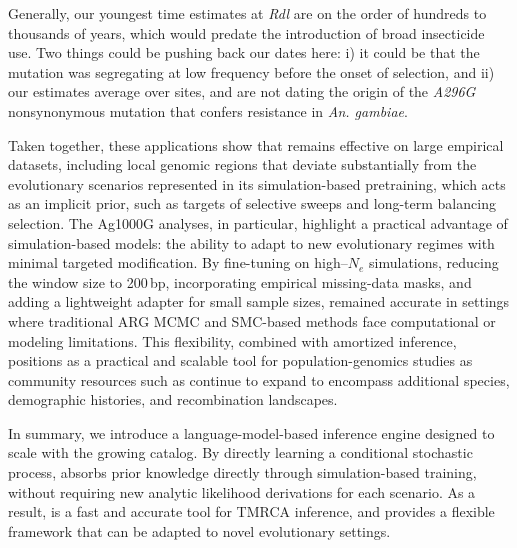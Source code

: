 \documentclass[9pt,twocolumn,twoside]{pnas-new}
\begin{document}
Generally, our youngest time estimates at \emph{Rdl} are on the order of hundreds to thousands of years, 
which would predate the introduction of broad insecticide use. 
Two things could be pushing back our dates here: i) it could
be that the mutation was segregating at low frequency before the onset of
selection, and ii) our estimates average over sites, and are not dating 
the origin of the \emph{A296G} nonsynonymous mutation that confers 
resistance in \emph{An. gambiae}.

Taken together, these applications show that \cxtkit remains effective on large empirical datasets, 
including local genomic regions that deviate substantially from the evolutionary scenarios represented in its simulation-based pretraining, which acts as an implicit prior, 
such as targets of selective sweeps and long-term balancing selection.
The Ag1000G analyses, in particular, highlight a practical advantage of simulation-based models: the ability to adapt to new evolutionary regimes with minimal targeted modification.
By fine-tuning on high--$N_e$ simulations, reducing the window size to 200\,bp, incorporating empirical missing-data masks, and adding a lightweight adapter for small sample sizes, \cxtkit remained accurate in settings where traditional ARG MCMC and SMC-based methods face computational or modeling limitations.
This flexibility, combined with amortized inference, positions \cxtkit as a practical and scalable tool for population-genomics studies as community resources such as \stdpopsim continue to expand to encompass additional species, demographic histories, and recombination landscapes.


In summary, we introduce a language-model-based inference engine designed to scale with the growing \stdpopsim catalog.
By directly learning a conditional stochastic process, \cxtkit absorbs prior knowledge directly through simulation-based training, without requiring new analytic likelihood derivations for each scenario.
As a result, \cxtkit is a fast and accurate tool for TMRCA inference, and provides a flexible framework that can be adapted to novel evolutionary settings.
\end{document}
